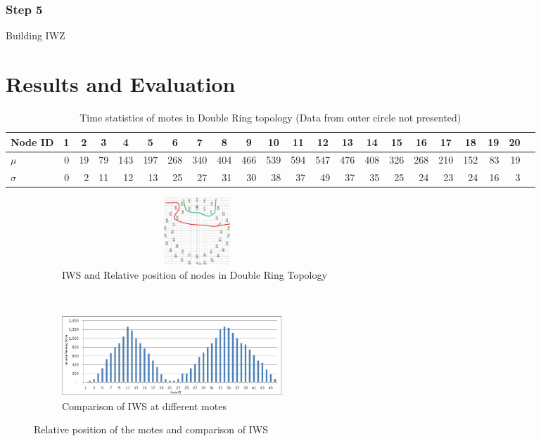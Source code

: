 \documentclass[conference]{IEEEtran}
\newcommand*{\bd}[1]{\multicolumn{1}{|c|}{\bfseries #1}}
\begin{document}
\subsubsection*{Step 5} 
Building IWZ


\section{Results and Evaluation}
\label{sec:eval}

\begin{table}[t!]
\centering
\begin{tabular}{|l|*{20}{r|}r|}
\hline
\bd{Node ID}           & \bd{1} & \bd{2} & \bd{3} & \bd{4} & \bd{5} & \bd{6} & \bd{7} & \bd{8} & \bd{9} & \bd{10} & \bd{11} & \bd{12} & \bd{13} & \bd{14} & \bd{15} & \bd{16} & \bd{17} & \bd{18} & \bd{19} & \bd{20} \\
\hline
$\mu$            & 0 &19 & 79& 143&197 &268&340&404&466&539 &594 &547 &476 &408 &326 & 268&210 & 152 & 83 & 19 \\
$\sigma$		 & 0 & 2 & 11 & 12 & 13 & 25& 27&31 &30 & 38 & 37 & 49 & 37 & 35 & 25  & 24 & 23 & 24 & 16 & 3 \\
\hline
\end{tabular}
\caption{Time statistics of motes in Double Ring topology (Data from outer circle not presented)}
\label{tab:stat_ellip}
\end{table}


\begin{figure}[t!]
    \centering
    \begin{subfigure}[b]{0.5\textwidth}
        \centering
        \includegraphics[height=1in, width=4in]{DoubleRingZ}
        \caption{IWS and Relative position of nodes in Double Ring Topology}
        \label{subfig:elliptopo} 
    \end{subfigure}%
    ~ 
    \begin{subfigure}[b]{0.5\textwidth}
        \centering
        \includegraphics[height=1.2in]{DR_Column}
        \caption{Comparison of IWS at different motes}
        \label{subfig:ellipgraph} %
    \end{subfigure}
    \caption{Relative position of the motes and comparison of IWS }
    \label{fig:ellip} %
\end{figure}
\end{document}
